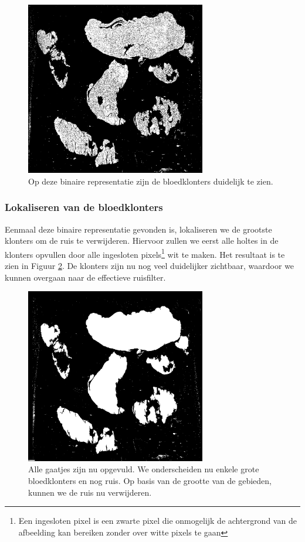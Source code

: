 \documentclass[a4paper,kulak]{kulakarticle}
\begin{document}
	\begin{figure}[H]
		\centering
		\includegraphics[width=0.7\textwidth]{grijswaarden_bin_vb}
		\caption{Op deze binaire representatie zijn de bloedklonters duidelijk te zien.}
		\label{figuur foto_bin}
	\end{figure}
	
	\subsubsection{Lokaliseren van de bloedklonters}
		Eenmaal deze binaire representatie gevonden is, lokaliseren we de grootste klonters om de ruis te verwijderen. Hiervoor zullen we eerst alle holtes in de klonters opvullen door alle ingesloten pixels\footnote{Een ingesloten pixel is een zwarte pixel die onmogelijk de achtergrond van de afbeelding kan bereiken zonder over witte pixels te gaan} wit te maken. Het resultaat is te zien in Figuur \ref{figuur lok_bloed}. De klonters zijn nu nog veel duidelijker zichtbaar, waardoor we kunnen overgaan naar de effectieve ruisfilter.

	\begin{figure}[H]
		\centering
		\includegraphics[width = 0.7\textwidth]{grijswaarden_bin_gevuld_vb}
		\caption{Alle gaatjes zijn nu opgevuld. We onderscheiden nu enkele grote bloedklonters en nog ruis. Op basis van de grootte van de gebieden, kunnen we de ruis nu verwijderen.}
		\label{figuur lok_bloed}
	\end{figure}
\end{document}
